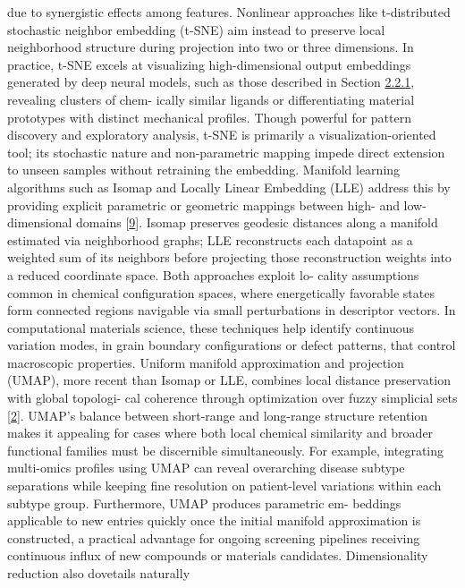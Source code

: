 \documentclass[
]{article}
\begin{document}
due to synergistic effects among features. Nonlinear approaches like
t-distributed stochastic neighbor embedding (t-SNE) aim instead to
preserve local neighborhood structure during projection into two or
three dimensions. In practice, t-SNE excels at visualizing
high-dimensional output embeddings generated by deep neural models, such
as those described in Section
\protect\hyperlink{feature-encoding-and-transformation}{2.2.1},
revealing clusters of chem- ically similar ligands or differentiating
material prototypes with distinct mechanical profiles. Though powerful
for pattern discovery and exploratory analysis, t-SNE is primarily a
visualization-oriented tool; its stochastic nature and non-parametric
mapping impede direct extension to unseen samples without retraining the
embedding. Manifold learning algorithms such as Isomap and Locally
Linear Embedding (LLE) address this by providing explicit parametric or
geometric mappings between high- and low-dimensional domains
{[}\protect\hyperlink{_bookmark49}{9}{]}. Isomap preserves geodesic
distances along a manifold estimated via neighborhood graphs; LLE
reconstructs each datapoint as a weighted sum of its neighbors before
projecting those reconstruction weights into a reduced coordinate space.
Both approaches exploit lo- cality assumptions common in chemical
configuration spaces, where energetically favorable states form
connected regions navigable via small perturbations in descriptor
vectors. In computational materials science, these techniques help
identify continuous variation modes, in grain boundary configurations or
defect patterns, that control macroscopic properties. Uniform manifold
approximation and projection (UMAP), more recent than Isomap or LLE,
combines local distance preservation with global topologi- cal coherence
through optimization over fuzzy simplicial sets
{[}\protect\hyperlink{_bookmark42}{2}{]}. UMAP's balance between
short-range and long-range structure retention makes it appealing for
cases where both local chemical similarity and broader functional
families must be discernible simultaneously. For example, integrating
multi-omics profiles using UMAP can reveal overarching disease subtype
separations while keeping fine resolution on patient-level variations
within each subtype group. Furthermore, UMAP produces parametric em-
beddings applicable to new entries quickly once the initial manifold
approximation is constructed, a practical advantage for ongoing
screening pipelines receiving continuous influx of new compounds or
materials candidates. Dimensionality reduction also dovetails naturally
\end{document}

